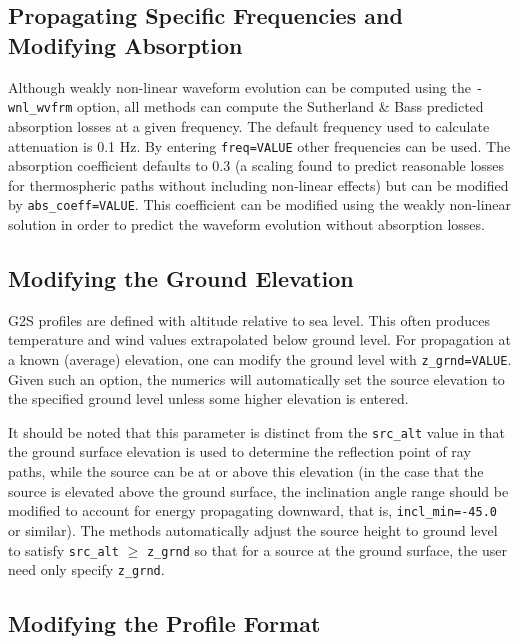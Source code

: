 \documentclass[10pt]{article}
\begin{document}
\subsection{Propagating Specific Frequencies and Modifying Absorption}
\label{Sect:AdditionalParams:freq}
\hspace{0.25in} Although weakly non-linear waveform evolution can be computed using the \verb=-wnl_wvfrm= option, all methods can compute the Sutherland \& Bass predicted absorption losses at a given frequency.  The default frequency used to calculate attenuation is 0.1 Hz.  By entering \verb#freq=VALUE# other frequencies can be used.  The absorption coefficient defaults to 0.3 (a scaling found to predict reasonable losses for thermospheric paths without including non-linear effects) but can be modified by \verb#abs_coeff=VALUE#.  This coefficient can be modified using the weakly non-linear solution in order to predict the waveform evolution without absorption losses. 

\subsection{Modifying the Ground Elevation}
\label{Sect:AdditionalParams:z_grnd}
\hspace{0.25in} G2S profiles are defined with altitude relative to sea level.  This often produces temperature and wind values extrapolated below ground level.  For propagation at a known (average) elevation, one can modify the ground level with \verb#z_grnd=VALUE#.  Given such an option, the numerics will automatically set the source elevation to the specified ground level unless some higher elevation is entered. 

It should be noted that this parameter is distinct from the \verb=src_alt= value in that the ground surface elevation is used to determine the reflection point of ray paths, while the source can be at or above this elevation (in the case that the source is elevated above the ground surface, the inclination angle range should be modified to account for energy propagating downward, that is, \verb#incl_min=-45.0# or similar).  The methods automatically adjust the source height to ground level to satisfy \verb#src_alt# \(\geq\) \verb#z_grnd# so that for a source at the ground surface, the user need only specify \verb#z_grnd#.

\subsection{Modifying the Profile Format}
\label{Sect:AdditionalParams:prof_format}
\end{document}
